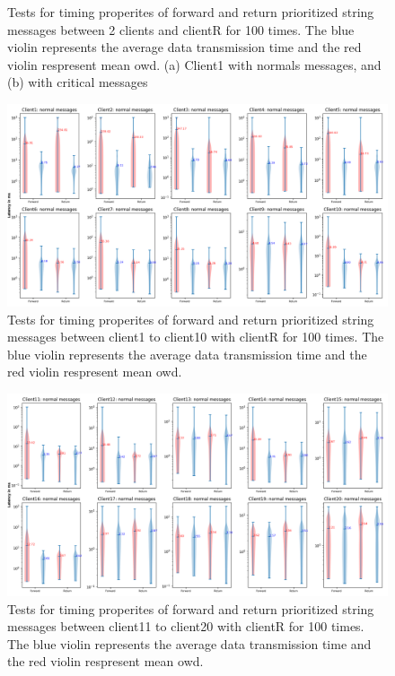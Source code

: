 \begin{figure}[h]
    
    \caption{Tests for timing properites of forward and return prioritized string messages between 2 clients 
    and clientR for 100 times. The blue violin represents the average data transmission time and the red violin 
    respresent mean \gls{owd}. (a) Client1 with normals messages, and (b) 
    with critical messages} \label{fig: priority-2clients-string}
\end{figure}



\begin{figure}
    \centering
    \includegraphics[width=\textheight]{figures/appendix/priority_tests/log_violin_50clients_string_figure_1.png}\hfill 
    \caption{Tests for timing properites of forward and return prioritized string messages between client1 to client10 
    with clientR for 100 times. The blue violin represents the average data transmission time and the red violin 
    respresent mean \gls{owd}.} \label{fig: priority-50clients-string-a}
\end{figure}

\begin{figure}
    \includegraphics[width=\textheight]{figures/appendix/priority_tests/log_violin_50clients_string_figure_2.png}\hfill 
    \caption{Tests for timing properites of forward and return prioritized string messages between client11 to client20 
    with clientR for 100 times. The blue violin represents the average data transmission time and the red violin 
    respresent mean \gls{owd}.} \label{fig: priority-50clients-string-b}
\end{figure}

